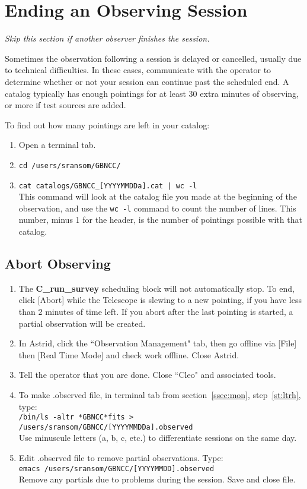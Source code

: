 \documentclass[11pt]{article}
\begin{document}

\section{Ending an Observing Session}  %
\textit{Skip this section if another observer finishes the session.}

Sometimes the observation following a session is delayed or cancelled, usually due to technical difficulties.  In these cases, communicate with the operator to determine whether or not your session can continue past the scheduled end.  A catalog typically has enough pointings for at least 30 extra minutes of observing, or more if test sources are added.  

To find out how many pointings are left in your catalog: \begin{enumerate} 
 \item Open a terminal tab. 
 \item \texttt{cd /users/sransom/GBNCC/}
 \item \texttt{cat catalogs/GBNCC\_[YYYYMMDDa].cat | wc -l} \\
 This command will look at the catalog file you made at the beginning of the observation, and use the \texttt{wc -l} command to count the number of lines.  This number, minus 1 for the header, is the number of pointings possible with that catalog.  \end{enumerate}


\subsection{Abort Observing}\label{ssec:abort}\begin{enumerate}  %
 \item The \textbf{C\_run\_survey} scheduling block will not automatically stop.  To end, click [Abort] while the Telescope is slewing to a new pointing, if you have less than 2 minutes of time left.  If you abort after the last pointing is started, a partial observation will be created. 
 \item In Astrid, click the ``Observation Management" tab, then go offline via [File] then [Real Time Mode] and check work offline.  Close Astrid.  
 \item Tell the operator that you are done.  Close ``Cleo" and associated tools. 
 \item To make .observed file, in terminal tab from section~\ref{ssec:mon}, step~\ref{st:ltrh}, type: \\
 \texttt{/bin/ls -altr *GBNCC*fits > /users/sransom/GBNCC/[YYYYMMDDa].observed} \\
 Use minuscule letters (a, b, c, etc.) to differentiate sessions on the same day. 
 \item Edit .observed file to remove partial observations. Type: \\
 \texttt{emacs /users/sransom/GBNCC/[YYYYMMDD].observed} \\
 Remove any partials due to problems during the session. Save and close file. 
\end{enumerate}
\end{document}

